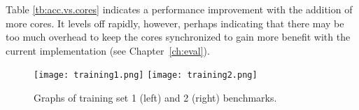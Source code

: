 \begin{table}
\centering
{}
	\caption{Benchmarking training set 2.}
	\label{tb:acc.vs.cores}
\end{table}

Table \ref{tb:acc.vs.cores} indicates a performance improvement with the addition of more cores. It levels off rapidly, however, perhaps indicating that there may be too much overhead to keep the cores synchronized to gain more benefit with the current implementation (see Chapter~\ref{ch:eval}).

\begin{figure}
\centerline{
	{\texttt{[image: training1.png]}}
	{\texttt{[image: training2.png]}}
	}
	\caption{Graphs of training set 1 (left) and 2 (right) benchmarks.}
	\label{fig:traininggraphs}
\end{figure}
